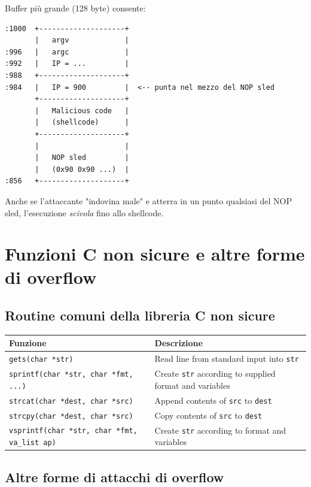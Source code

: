 Buffer pi\`u grande (128 byte) consente:
\begin{verbatim}
:1000  +--------------------+
       |   argv             |
:996   |   argc             |
:992   |   IP = ...         |
:988   +--------------------+
:984   |   IP = 900         |  <-- punta nel mezzo del NOP sled
       +--------------------+
       |   Malicious code   |
       |   (shellcode)      |
       +--------------------+
       |                    |
       |   NOP sled         |
       |   (0x90 0x90 ...)  |
:856   +--------------------+
\end{verbatim}

Anche se l'attaccante "indovina male" e atterra in un punto qualsiasi del NOP sled, l'esecuzione \textit{scivola} fino allo shellcode.

\section{Funzioni C non sicure e altre forme di overflow}

\subsection{Routine comuni della libreria C non sicure}

\begin{center}
\begin{tabular}{|l|p{8cm}|}
\hline
\textbf{Funzione} & \textbf{Descrizione} \\
\hline
\texttt{gets(char *str)} & Read line from standard input into \texttt{str} \\
\texttt{sprintf(char *str, char *fmt, ...)} & Create \texttt{str} according to supplied format and variables \\
\texttt{strcat(char *dest, char *src)} & Append contents of \texttt{src} to \texttt{dest} \\
\texttt{strcpy(char *dest, char *src)} & Copy contents of \texttt{src} to \texttt{dest} \\
\texttt{vsprintf(char *str, char *fmt, va\_list ap)} & Create \texttt{str} according to format and variables \\
\hline
\end{tabular}
\end{center}


\subsection{Altre forme di attacchi di overflow}


